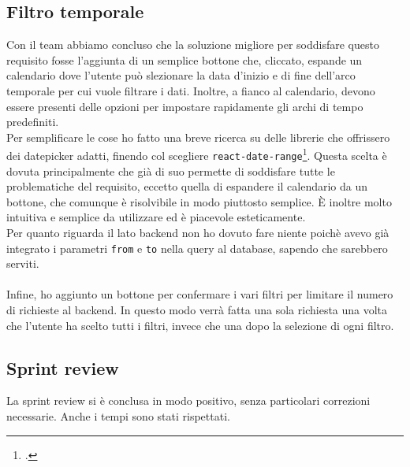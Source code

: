 \subsection{Filtro temporale}
Con il team abbiamo concluso che la soluzione migliore per soddisfare questo requisito fosse l'aggiunta di un semplice bottone che, cliccato, espande un calendario dove l'utente può slezionare la data d'inizio e di fine dell'arco temporale per cui vuole filtrare i dati. Inoltre, a fianco al calendario, devono essere presenti delle opzioni per impostare rapidamente gli archi di tempo predefiniti. \\
Per semplificare le cose ho fatto una breve ricerca su delle librerie che offrissero dei datepicker adatti, finendo col scegliere \texttt{react-date-range}\footcite{site:rdr}. Questa scelta è dovuta principalmente che già di suo permette di soddisfare tutte le problematiche del requisito, eccetto quella di espandere il calendario da un bottone, che comunque è risolvibile in modo piuttosto semplice. È inoltre molto intuitiva e semplice da utilizzare ed è piacevole esteticamente.\\
Per quanto riguarda il lato backend non ho dovuto fare niente poichè avevo già integrato i parametri \texttt{from} e \texttt{to} nella query al database, sapendo che sarebbero serviti.\\\\
Infine, ho aggiunto un bottone per confermare i vari filtri per limitare il numero di richieste al backend. In questo modo verrà fatta una sola richiesta una volta che l'utente ha scelto tutti i filtri, invece che una dopo la selezione di ogni filtro.

\subsection{Sprint review}
La sprint review si è conclusa in modo positivo, senza particolari correzioni necessarie. Anche i tempi sono stati rispettati.